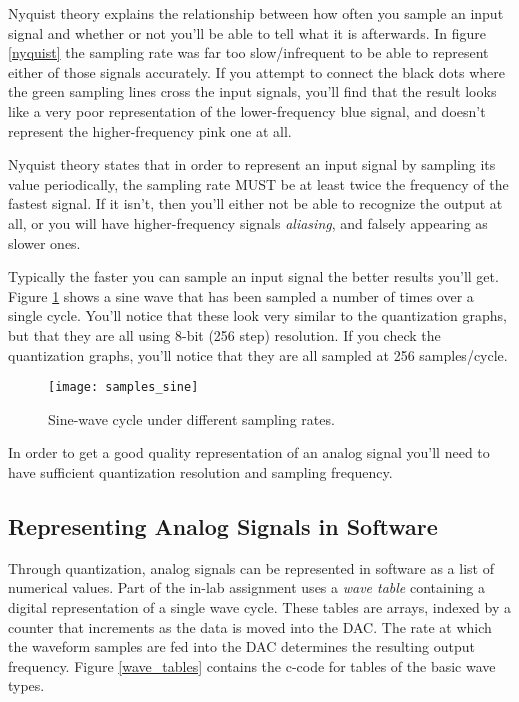 \documentclass[openany,11pt,fleqn]{book} %
\begin{document}
Nyquist theory explains the relationship between how often you sample an input signal and whether or not you'll be able to tell what it is afterwards. In figure \ref{nyquist} the sampling rate was far too slow/infrequent to be able to represent either of those signals accurately. If you attempt to connect the black dots where the green sampling lines cross the input signals, you'll find that the result looks like a very poor representation of the lower-frequency blue signal, and doesn't represent the higher-frequency pink one at all. 

Nyquist theory states that in order to represent an input signal by sampling its value periodically, the sampling rate MUST be at least twice the frequency of the fastest signal. If it isn't, then you'll either not be able to recognize the output at all, or you will have higher-frequency signals \textit{aliasing}, and falsely appearing as slower ones.

Typically the faster you can sample an input signal the better results you'll get. Figure \ref{samples_sine} shows a sine wave that has been sampled a number of times over a single cycle. You'll notice that these look very similar to the quantization graphs, but that they are all using 8-bit (256 step) resolution. If you check the quantization graphs, you'll notice that they are all sampled at 256 samples/cycle. 

\begin{figure}[]
    \centering\texttt{[image: samples\_sine]}
    \caption{Sine-wave cycle under different sampling rates.}
    \label{samples_sine}
\end{figure}

 In order to get a good quality representation of an analog signal you'll need to have sufficient quantization resolution and sampling frequency. 
 
\subsection{\color{orange}Representing Analog Signals in Software} 
 Through quantization, analog signals can be represented in software as a list of numerical values. Part of the in-lab assignment uses a \textit{wave table} containing a digital representation of a single wave cycle. These tables are arrays, indexed by a counter that increments as the data is moved into the DAC. The rate at which the waveform samples are fed into the DAC determines the resulting output frequency. Figure \ref{wave_tables} contains the c-code for tables of the basic wave types.
 
\end{document}
